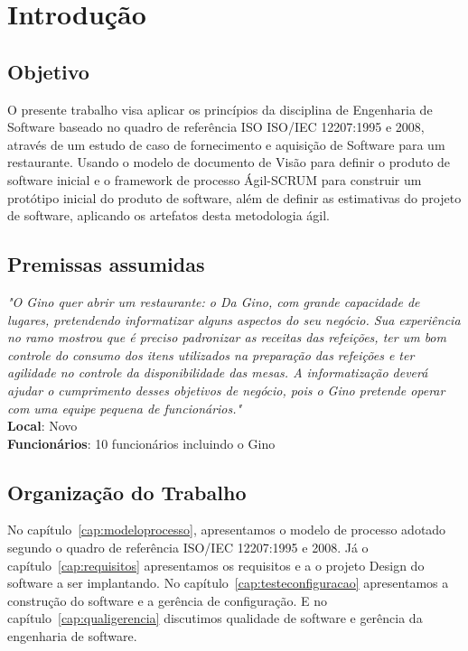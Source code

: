 \chapter{Introdução}
\label{cap:introducao}

\section{Objetivo}

O presente trabalho visa aplicar os princípios da disciplina de Engenharia de Software baseado no quadro de referência ISO ISO/IEC 12207:1995 e 2008, através de um estudo de caso de fornecimento e aquisição de Software para um restaurante. Usando o modelo de documento de Visão para definir o produto de software inicial e o framework de processo Ágil-SCRUM para construir um protótipo inicial do produto de software, além de definir as estimativas do projeto de software, aplicando os artefatos desta metodologia ágil. 

\section{Premissas assumidas}

\emph{"O Gino quer abrir um restaurante: o Da Gino, com grande capacidade de lugares, pretendendo informatizar alguns aspectos do seu negócio. Sua experiência no ramo mostrou que é preciso padronizar as receitas das refeições, ter um bom controle do consumo dos itens utilizados na preparação das refeições e ter agilidade no controle da disponibilidade das mesas. A informatização deverá ajudar o cumprimento desses objetivos de negócio, pois o Gino pretende operar com uma equipe pequena de funcionários."}\\
\textbf{Local}: Novo\\
\textbf{Funcionários}: 10 funcionários incluindo o Gino

\section{Organização do Trabalho}
\label{sec:organizacao_trabalho}

No capítulo~\ref{cap:modeloprocesso}, apresentamos o modelo de processo adotado segundo o quadro de referência ISO/IEC 12207:1995 e 2008. Já o capítulo~\ref{cap:requisitos} apresentamos os requisitos e a o projeto Design do software a ser implantando. No capítulo~\ref{cap:testeconfiguracao} apresentamos a construção do software e a gerência de configuração. E no capítulo~\ref{cap:qualigerencia} discutimos qualidade de software e gerência da engenharia de software.


